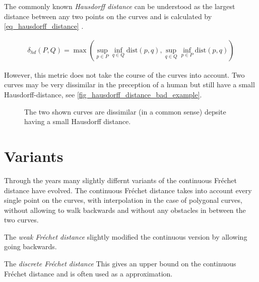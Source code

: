 \documentclass[
oneside,
fontsize=11pt
]{scrartcl}
\begin{document}
The commonly known \textit{Hausdorff distance} can be understood 
as the largest distance between any two points on the curves 
and is calculated by \autoref{eq_hausdorff_distance} \cite{alt_computing_1995}.

\begin{align}
  \label{eq_hausdorff_distance}
  \delta_{hd}(P,Q) = \max \left( \sup_{p \in P} \inf_{q \in Q} \text{dist}(p,q), \sup_{q \in Q} \inf_{p \in P} \text{dist}(p,q) \right)
\end{align}

However, this metric does not take the course of the curves into account. 
Two curves may be very dissimilar in the preception of a human 
but still have a small Hausdorff-distance, see \autoref{fig_hausdorff_distance_bad_example}.

\begin{figure}[ht]
  \caption[Hausdorff distance of two dissimilar curves]{The two shown curves are dissimilar (in a common sense) depsite having a small Hausdorff distance.}
  \label{fig_hausdorff_distance_bad_example}
\end{figure}







\section{Variants}
Through the years many slightly differnt variants of the continuous Fréchet distance have evolved. 
The continuous Fréchet distance takes into account every single point on the curves, 
with interpolation in the case of polygonal curves, 
without allowing to walk backwards 
and without any obstacles in between the two curves.

The \textit{weak Fréchet distance} slightly modified the continuous version by allowing 
going backwards. 

The \textit{discrete Fréchet distance} 
This gives an upper bound on the continuous Fréchet distance %
and is often used as a approximation. %

\end{document}
